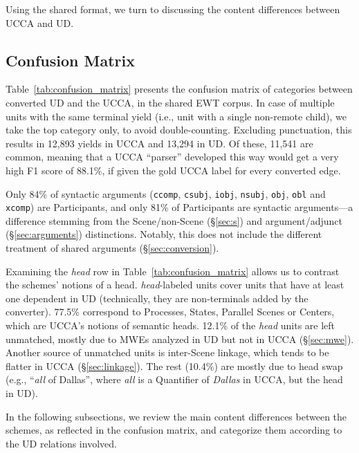 \documentclass[11pt,a4paper]{article}
\begin{document}
Using the shared format,
we turn to discussing the content differences between UCCA and UD.


\subsection{Confusion Matrix}\label{sec:confusion}

Table~\ref{tab:confusion_matrix} presents the confusion matrix of categories between converted UD
and the UCCA, in the shared EWT corpus.
In case of multiple units with the same terminal yield (i.e., unit with a single non-remote child),
we take the top category only, to avoid double-counting.
Excluding punctuation, this results in 12,893 yields in UCCA and
13,294 in UD.
Of these, 11,541 are common, meaning that a UCCA ``parser'' developed this way
would get a very high F1 score
of 88.1\%, if given the gold UCCA label for every converted edge.

Only 84\% of syntactic arguments
(\texttt{ccomp}, \texttt{csubj}, \texttt{iobj}, \texttt{nsubj}, \texttt{obj}, \texttt{obl} and \texttt{xcomp})
are Participants,
and only 81\% of Participants are syntactic arguments---a difference stemming from
the Scene/non-Scene (\S\ref{sec:s}) and argument/adjunct (\S\ref{sec:arguments}) distinctions.
Notably, this does not include the different treatment of shared arguments (\S\ref{sec:conversion}).

Examining the {\it head} row in Table~\ref{tab:confusion_matrix} allows
us to contrast the schemes' notions of a head. 
{\it head}-labeled units cover units that have at least
one dependent in UD (technically, they are non-terminals added by the converter).
77.5\% correspond to Processes, States, Parallel Scenes or Centers,
which are UCCA's notions of semantic heads.
12.1\% of the {\it head} units are left unmatched, mostly due to MWEs analyzed in
UD but not in UCCA (\S\ref{sec:mwe}).
Another source of unmatched units is inter-Scene linkage, which tends to be flatter in
UCCA (\S\ref{sec:linkage}).
The rest (10.4\%) are mostly due to head swap (e.g., ``\textit{all} of Dallas'', where \textit{all}
is a Quantifier of \textit{Dallas} in UCCA, but the head in UD).

In the following subsections, we review the main content differences between the schemes,
as reflected in the confusion matrix, and categorize them according to the UD relations
involved.
\end{document}

